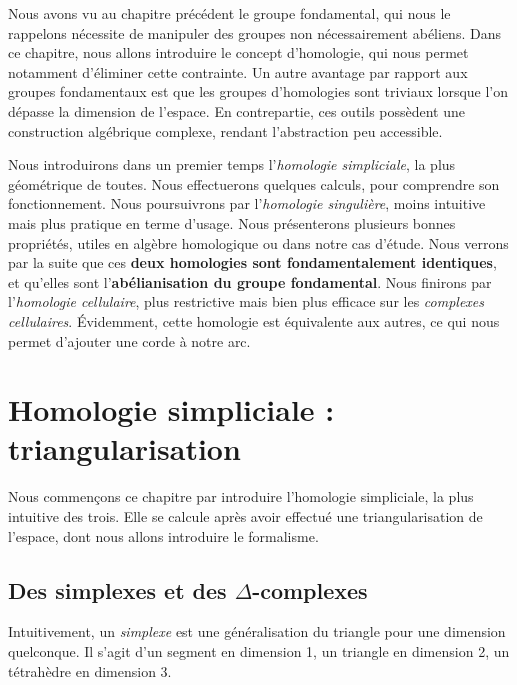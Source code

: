 
Nous avons vu au chapitre précédent le groupe fondamental, qui nous le rappelons nécessite de manipuler des groupes non nécessairement abéliens. Dans ce chapitre, nous allons introduire le concept d'homologie, qui nous permet notamment d'éliminer cette contrainte. Un autre avantage par rapport aux groupes fondamentaux est que les groupes d'homologies sont triviaux lorsque l'on dépasse la dimension de l'espace. En contrepartie, ces outils possèdent une construction algébrique complexe, rendant l'abstraction peu accessible.

Nous introduirons dans un premier temps l'\emph{homologie simpliciale}, la plus géométrique de toutes. Nous effectuerons quelques calculs, pour comprendre son fonctionnement. Nous poursuivrons par l'\emph{homologie singulière}, moins intuitive mais plus pratique en terme d'usage. Nous présenterons plusieurs bonnes propriétés, utiles en algèbre homologique ou dans notre cas d'étude. Nous verrons par la suite que ces \textbf{deux homologies sont fondamentalement identiques}, et qu'elles sont l'\textbf{abélianisation du groupe fondamental}. Nous finirons par l'\emph{homologie cellulaire}, plus restrictive mais bien plus efficace sur les \emph{complexes cellulaires}. Évidemment, cette homologie est équivalente aux autres, ce qui nous permet d'ajouter une corde à notre arc.

\section{Homologie simpliciale : triangularisation}

Nous commençons ce chapitre par introduire l'homologie simpliciale, la plus intuitive des trois. Elle se calcule après avoir effectué une triangularisation de l'espace, dont nous allons introduire le formalisme.

\subsection{Des simplexes et des $\Delta$-complexes}\label{sect:simplices}

Intuitivement, un \emph{simplexe} est une généralisation du triangle pour une dimension quelconque. Il s'agit d'un segment en dimension 1, un triangle en dimension 2, un tétrahèdre en dimension 3.

